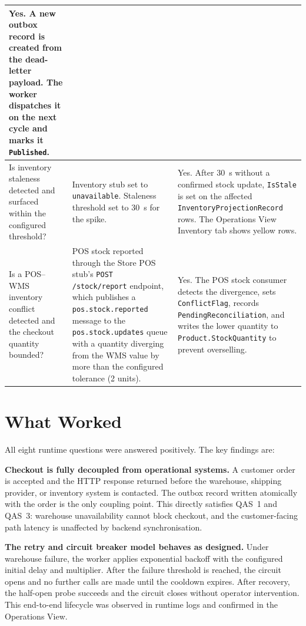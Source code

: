 \begin{center}
\begin{tabular}{|p{}|p{}|p{}|}
Yes. A new outbox record is created from the dead-letter payload. The worker dispatches it
on the next cycle and marks it \texttt{Published}. \\
\hline
Is inventory staleness detected and surfaced within the configured threshold? &
Inventory stub set to \texttt{unavailable}. Staleness threshold set to 30~s for the spike. &
Yes. After 30~s without a confirmed stock update, \texttt{IsStale} is set on the affected
\texttt{InventoryProjectionRecord} rows. The Operations View Inventory tab shows yellow
rows. \\
\hline
Is a POS--WMS inventory conflict detected and the checkout quantity bounded? &
POS stock reported through the Store POS stub's \texttt{POST /stock/report} endpoint, which
publishes a \texttt{pos.stock.reported} message to the \texttt{pos.stock.updates}
queue with a quantity diverging from the WMS value by more than the configured tolerance (2 units). &
Yes. The POS stock consumer detects the divergence, sets \texttt{ConflictFlag},
records \texttt{PendingReconciliation}, and writes the lower quantity to
\texttt{Product.StockQuantity} to prevent overselling. \\
\hline
\end{tabular}
\end{center}
\endgroup

\section{What Worked}

All eight runtime questions were answered positively. The key findings are:

\textbf{Checkout is fully decoupled from operational systems.} A customer order is accepted
and the HTTP response returned before the warehouse, shipping provider, or inventory system
is contacted. The outbox record written atomically with the order is the only coupling point.
This directly satisfies QAS~1 and QAS~3: warehouse unavailability cannot block checkout, and
the customer-facing path latency is unaffected by backend synchronisation.

\textbf{The retry and circuit breaker model behaves as designed.} Under warehouse failure,
the worker applies exponential backoff with the configured initial delay and multiplier. After
the failure threshold is reached, the circuit opens and no further calls are made until the
cooldown expires. After recovery, the half-open probe succeeds and the circuit closes without
operator intervention. This end-to-end lifecycle was observed in runtime logs and confirmed
in the Operations View.

